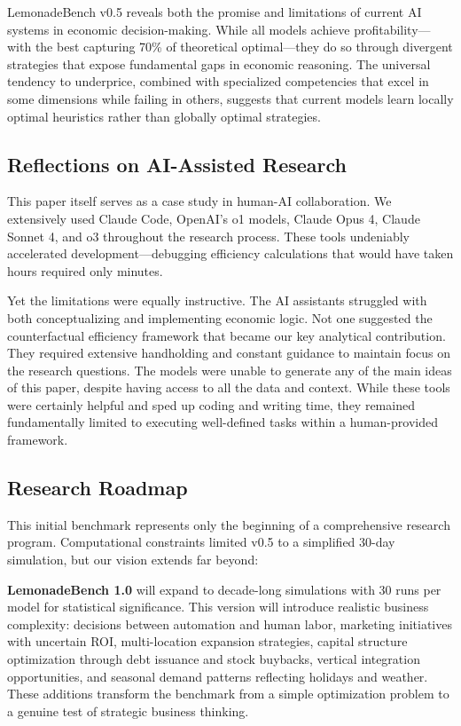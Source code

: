 \documentclass[11pt]{article}
\begin{document}
LemonadeBench v0.5 reveals both the promise and limitations of current AI systems in economic decision-making. While all models achieve profitability—with the best capturing 70\% of theoretical optimal—they do so through divergent strategies that expose fundamental gaps in economic reasoning. The universal tendency to underprice, combined with specialized competencies that excel in some dimensions while failing in others, suggests that current models learn locally optimal heuristics rather than globally optimal strategies.

\subsection{Reflections on AI-Assisted Research}

This paper itself serves as a case study in human-AI collaboration. We extensively used Claude Code, OpenAI's o1 models, Claude Opus 4, Claude Sonnet 4, and o3 throughout the research process. These tools undeniably accelerated development—debugging efficiency calculations that would have taken hours required only minutes.

Yet the limitations were equally instructive. The AI assistants struggled with both conceptualizing and implementing economic logic. Not one suggested the counterfactual efficiency framework that became our key analytical contribution. They required extensive handholding and constant guidance to maintain focus on the research questions. The models were unable to generate any of the main ideas of this paper, despite having access to all the data and context. While these tools were certainly helpful and sped up coding and writing time, they remained fundamentally limited to executing well-defined tasks within a human-provided framework.

\subsection{Research Roadmap}

This initial benchmark represents only the beginning of a comprehensive research program. Computational constraints limited v0.5 to a simplified 30-day simulation, but our vision extends far beyond:

\textbf{LemonadeBench 1.0} will expand to decade-long simulations with 30 runs per model for statistical significance. This version will introduce realistic business complexity: decisions between automation and human labor, marketing initiatives with uncertain ROI, multi-location expansion strategies, capital structure optimization through debt issuance and stock buybacks, vertical integration opportunities, and seasonal demand patterns reflecting holidays and weather. These additions transform the benchmark from a simple optimization problem to a genuine test of strategic business thinking.
\end{document}
